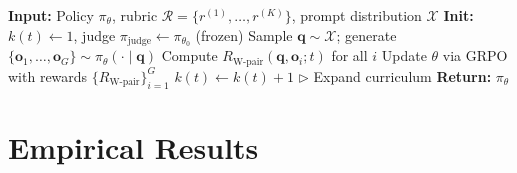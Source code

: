 \documentclass{article}
\theoremstyle{plain}
\theoremstyle{definition}
\theoremstyle{remark}
\begin{document}
\begin{algorithm}[h]
  \caption{Rubric Curriculum RL (RcRL)}
  \label{alg:rcrl}
  \begin{algorithmic}[1]
    \STATE \textbf{Input:} Policy $\pi_\theta$, rubric $\mathcal{R} = \{r^{(1)}, \ldots, r^{(K)}\}$, prompt distribution $\mathcal{X}$
    \STATE \textbf{Init:} $k(t) \leftarrow 1$, judge $\pi_{\mathrm{judge}} \leftarrow \pi_{\theta_0}$ (frozen)
      \STATE Sample $\mathbf{q} \sim \mathcal{X}$; generate $\{\mathbf{o}_1, \ldots, \mathbf{o}_G\} \sim \pi_\theta(\cdot \mid \mathbf{q})$
      \STATE Compute $R_{\mathrm{W\text{-}pair}}(\mathbf{q}, \mathbf{o}_i; t)$ for all $i$
      \STATE Update $\theta$ via GRPO with rewards $\{R_{\mathrm{W\text{-}pair}}\}_{i=1}^G$
        \STATE $k(t) \leftarrow k(t) + 1$ \hfill $\triangleright$ Expand curriculum
      \ENDIF
    \ENDFOR
    \STATE \textbf{Return:} $\pi_\theta$
  \end{algorithmic}
\end{algorithm}

\section{Empirical Results}
\label{sec:empirical}
\end{document}

